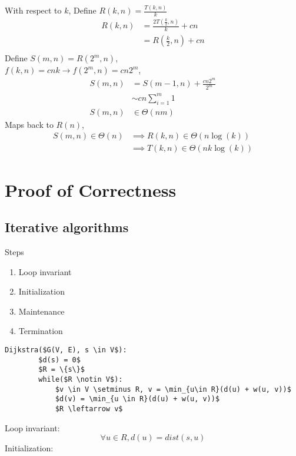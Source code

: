 \documentclass{article}
\begin{document}
With respect to $k$, Define $R(k, n) = \frac{T(k, n)}{k}$
\begin{align*}
    R(k, n) &= \frac{2 T(\frac{k}{2}, n)}{k} + cn\\
    &= R(\frac{k}{2}, n) + cn\\
\end{align*}
Define $S(m, n) = R(2^m, n)$,\\
$f(k, n) = cnk \rightarrow f(2^m, n) = cn2^m$, 
\begin{align*}
    S(m, n) &= S(m - 1, n) + \frac{cn2^m}{2^m}\\
    & \sim cn\sum_{i=1}^{m} 1\\
    S(m, n) &\in \Theta(nm)
\end{align*}
Maps back to $R(n)$,
\begin{align*}
    S(m, n) \in \Theta(n) &\implies R(k, n) \in \Theta(n\log(k))\\
    &\implies T(k, n) \in \Theta(nk\log(k))
\end{align*}


\section{Proof of Correctness}
\subsection*{Iterative algorithms}
Steps
\begin{enumerate}
    \item Loop invariant
    \item Initialization
    \item Maintenance
    \item Termination
\end{enumerate}
\begin{lstlisting}[mathescape=true]
    Dijkstra($G(V, E), s \in V$):
        $d(s) = 0$
        $R = \{s\}$
        while($R \notin V$):
            $v \in V \setminus R, v = \min_{u\in R}(d(u) + w(u, v))$
            $d(v) = \min_{u \in R}(d(u) + w(u, v))$
            $R \leftarrow v$
\end{lstlisting}
Loop invariant: 
\[\forall u \in R, d(u) = dist(s, u)\]
Initialization:
\end{document}
